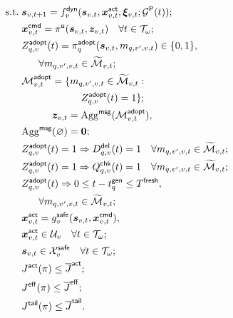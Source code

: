 \documentclass[10pt,a4paper,twocolumn]{article}
\begin{document}
\begin{subequations}
\begin{align}
\mathrm{s.t.}\;&\bm s_{v,t+1}=f_v^{\mathsf{dyn}}(\bm s_{v,t},\bm x_{v,t}^{\mathsf{act}},\boldsymbol\xi_{v,t};
\mathcal G^{\mathsf P}(t));
\label{eq:P2-a}\\
&\bm x_{v,t}^{\mathsf{cmd}}=\pi^{\mathsf u}(\bm s_{v,t},\bm z_{v,t})
\quad\forall t\in\mathcal T_{\omega};
\label{eq:P2-b}\\
&\begin{aligned}
Z_{q,v}^{\mathsf{adopt}}(t)&=\pi_{q}^{\mathsf{adopt}}(\bm s_{v,t},m_{q,v',v,t})\in\{0,1\},\\
&\hspace{-2em}\forall m_{q,v',v,t}\in\widetilde{\mathcal M}_{v,t};
\end{aligned}
\label{eq:P2-c}\\
&\begin{aligned}
\mathcal M_{v,t}^{\mathsf{adopt}}=\{m_{q,v',v,t}\in\widetilde{\mathcal M}_{v,t}:\\
Z_{q,v}^{\mathsf{adopt}}(t)=1\};
\end{aligned}
\label{eq:P2-d}\\
&\begin{aligned}
\bm z_{v,t}&=\operatorname{Agg}^{\mathsf{msg}}(\mathcal M_{v,t}^{\mathsf{adopt}}),\\
\operatorname{Agg}^{\mathsf{msg}}(\varnothing)&=\bm 0;
\end{aligned}
\label{eq:P2-e}\\
&Z_{q,v}^{\mathsf{adopt}}(t)=1\Rightarrow D_{q,v}^{\mathsf{del}}(t)=1
\quad\forall m_{q,v',v,t}\in\widetilde{\mathcal M}_{v,t};
\label{eq:P2-f}\\
&Z_{q,v}^{\mathsf{adopt}}(t)=1\Rightarrow Q_{q,v}^{\mathsf{chk}}(t)=1
\quad\forall m_{q,v',v,t}\in\widetilde{\mathcal M}_{v,t};
\label{eq:P2-g}\\
&\begin{aligned}
Z_{q,v}^{\mathsf{adopt}}(t)&\Rightarrow
0\leq t-t_q^{\mathsf{gen}}\leq T^{\mathsf{fresh}},\\
&\hspace{-2em}\forall m_{q,v',v,t}\in\widetilde{\mathcal M}_{v,t};
\end{aligned}
\label{eq:P2-h}\\
&\begin{aligned}
\bm x_{v,t}^{\mathsf{act}}&=g_v^{\mathsf{safe}}(\bm s_{v,t},\bm x_{v,t}^{\mathsf{cmd}}),\\
\bm x_{v,t}^{\mathsf{act}}&\in\mathcal U_v\quad\forall t\in\mathcal T_{\omega};
\end{aligned}
\label{eq:P2-i}\\
&\bm s_{v,t}\in\mathcal X_v^{\mathsf{safe}}\quad\forall t\in\mathcal T_{\omega};
\label{eq:P2-j}\\
&J^{\mathsf{act}}(\pi)\leq\overline J^{\mathsf{act}};
\label{eq:P2-k}\\
&J^{\mathsf{eff}}(\pi)\leq\overline J^{\mathsf{eff}};
\label{eq:P2-l}\\
&J^{\mathsf{tail}}(\pi)\leq\overline J^{\mathsf{tail}}.
\label{eq:P2-m}
\end{align}
\end{subequations}
\end{document}
